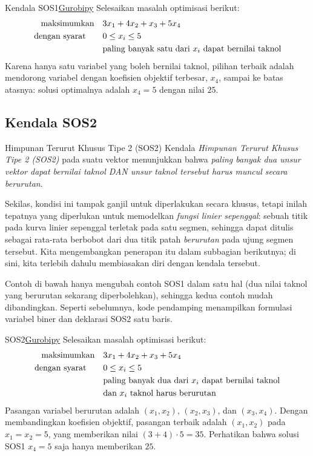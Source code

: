 \begin{examplewithcode}{Kendala SOS1}{\href{https://github.com/open-optimization/open-optimization-or-examples/blob/master/nonlinear-programming/Gurobi-SOS-Examples.ipynb}{Gurobipy}}
\label{example:sos1}
Selesaikan masalah optimisasi berikut: \[\begin{aligned}
\mbox{maksimumkan}\quad & 3x_1 + 4x_2 + x_3 + 5x_4 \\
\mbox{dengan syarat}\quad \quad & 0 \le x_i \le 5 \\
& \mbox{paling banyak satu dari $x_i$ dapat bernilai taknol}
\end{aligned}\]
Karena hanya satu variabel yang boleh bernilai taknol, pilihan terbaik adalah mendorong variabel dengan koefisien objektif terbesar, $x_4$, sampai ke batas atasnya: solusi optimalnya adalah $x_4 = 5$ dengan nilai $25$.
\end{examplewithcode}
\subsection{Kendala SOS2}
\begin{definition}{Himpunan Terurut Khusus Tipe 2 (SOS2)}{}
Kendala \emph{Himpunan Terurut Khusus Tipe 2 (SOS2)} pada suatu vektor menunjukkan bahwa \emph{paling banyak dua unsur vektor dapat bernilai taknol DAN unsur taknol tersebut harus muncul secara berurutan}.
\end{definition}
Sekilas, kondisi ini tampak ganjil untuk diperlakukan secara khusus, tetapi inilah tepatnya yang diperlukan untuk memodelkan \emph{fungsi linier sepenggal}: sebuah titik pada kurva linier sepenggal terletak pada satu segmen, sehingga dapat ditulis sebagai rata-rata berbobot dari dua titik patah \emph{berurutan} pada ujung segmen tersebut. Kita mengembangkan penerapan itu dalam subbagian berikutnya; di sini, kita terlebih dahulu membiasakan diri dengan kendala tersebut.

Contoh di bawah hanya mengubah contoh SOS1 dalam satu hal (dua nilai taknol yang berurutan sekarang diperbolehkan), sehingga kedua contoh mudah dibandingkan. Seperti sebelumnya, kode pendamping menampilkan formulasi variabel biner dan deklarasi SOS2 satu baris.

\begin{examplewithcode}{SOS2}{\href{https://github.com/open-optimization/open-optimization-or-examples/blob/master/nonlinear-programming/Gurobi-SOS-Examples.ipynb}{Gurobipy}}
\label{example:SOS2}
Selesaikan masalah optimisasi berikut: \[\begin{aligned}
\mbox{maksimumkan}\quad & 3x_1 + 4x_2 + x_3 + 5x_4 \\
\mbox{dengan syarat}\quad \quad & 0 \le x_i \le 5 \\
& \mbox{paling banyak dua dari $x_i$ dapat bernilai taknol} \\
& \mbox{dan $x_i$ taknol harus berurutan}
\end{aligned}\]
Pasangan variabel berurutan adalah $(x_1,x_2)$, $(x_2,x_3)$, dan $(x_3,x_4)$. Dengan membandingkan koefisien objektif, pasangan terbaik adalah $(x_1, x_2)$ pada $x_1 = x_2 = 5$, yang memberikan nilai $(3+4)\cdot 5 = 35$. Perhatikan bahwa solusi SOS1 $x_4=5$ saja hanya memberikan $25$.
\end{examplewithcode}

